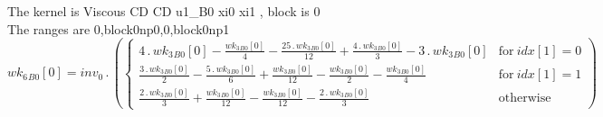 \documentclass{article}
\begin{document}
\noindent The kernel is Viscous CD CD u1_B0 xi0 xi1 , block is 0\\\noindent The ranges are 0,block0np0,0,block0np1\\\begin{dmath}{wk_{6}{_{B0}}}[{0}] = inv_0 \,.\, \left(\begin{cases} 4 \,.\, {wk_{3}{_{B0}}}[{0}] - \frac{{wk_{3}{_{B0}}}[{0}]}{4} - \frac{25 \,.\, {wk_{3}{_{B0}}}[{0}]}{12} + \frac{4 \,.\, {wk_{3}{_{B0}}}[{0}]}{3} - 3 \,.\, {wk_{3}{_{B0}}}[{0}] & 
\text{for}\: {idx}[{1}] = 0 \\\frac{3 \,.\, {wk_{3}{_{B0}}}[{0}]}{2} - \frac{5 \,.\, {wk_{3}{_{B0}}}[{0}]}{6} + \frac{{wk_{3}{_{B0}}}[{0}]}{12} - \frac{{wk_{3}{_{B0}}}[{0}]}{2} - \frac{{wk_{3}{_{B0}}}[{0}]}{4} & \text{for}\: {idx}[{1}] = 1 \\\frac{2 
\,.\, {wk_{3}{_{B0}}}[{0}]}{3} + \frac{{wk_{3}{_{B0}}}[{0}]}{12} - \frac{{wk_{3}{_{B0}}}[{0}]}{12} - \frac{2 \,.\, {wk_{3}{_{B0}}}[{0}]}{3} & \text{otherwise} \end{cases}\right)\end{dmath}
\end{document}
